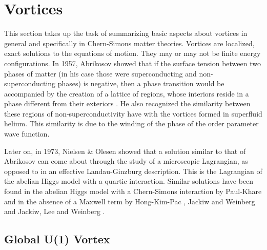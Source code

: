         \section{Vortices} \label{vortices_sec}
        This section takes up the task of summarizing basic aspects about vortices in general and specifically in Chern-Simons matter theories.
        Vortices are localized, exact solutions to the equations of motion. They may or may not be finite energy configurations.
        In 1957, Abrikosov  showed that if the surface tension between two phases of matter (in his case those were superconducting and non-superconducting phases) is negative, then a phase transition would be accompanied by the creation of a lattice of regions, whose interiors reside in a phase different from their exteriors \cite{Abrikosov1957}. He also recognized the similarity between these regions of non-superconductivity have with the vortices formed in superfluid helium. This similarity is due to the winding of the phase of the order parameter wave function.


        Later on, in 1973, Nielsen \& Olesen \cite{Nielsen:1973cs} showed that a solution similar to that of Abrikosov can come about through the study of a microscopic Lagrangian, as opposed to in an effective Landau-Ginzburg description. This is the Lagrangian of the abelian Higgs model with a quartic interaction. Similar solutions have been found in the abelian Higgs model with a Chern-Simons interaction by Paul-Khare \cite{Paul:1986ix} and in the absence of a Maxwell term by Hong-Kim-Pac \cite{Hong:1990yh}, Jackiw and Weinberg \cite{Jackiw:1990aw} and Jackiw, Lee and Weinberg \cite{Jackiw:1990pr}.

        \subsection{Global U(1) Vortex}

